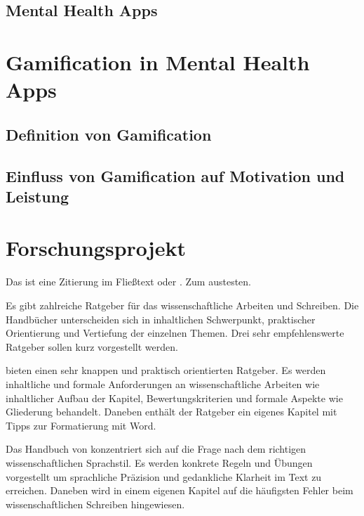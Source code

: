 \subsection{Mental Health Apps}\label{subsubsec:mental_health_apps}



\section{Gamification in Mental Health Apps}\label{subsec:gamification_in_mental_health_apps}


\subsection{Definition von Gamification}\label{subsubsec:definition_gamification}

\subsection{Einfluss von Gamification auf Motivation und Leistung}\label{subsubsec:einfluss_gamification_motivation_leistung}



\section{Forschungsprojekt}\label{subsec:forschungsprojekt}

Das ist eine Zitierung im Fließtext \cite[S. 6]{wagner2021psychische} oder \cite[S. 11]{mustermann2013test}. Zum austesten.


Es gibt zahlreiche Ratgeber für das wissenschaftliche Arbeiten und Schreiben. Die Handbücher unterscheiden sich in inhaltlichen Schwerpunkt, praktischer Orientierung und Vertiefung der einzelnen Themen. Drei sehr empfehlenswerte Ratgeber sollen kurz vorgestellt werden.

\cite{karmasin2012gestaltung} bieten einen sehr knappen und praktisch orientierten Ratgeber. Es werden inhaltliche und formale Anforderungen an wissenschaftliche Arbeiten wie inhaltlicher Aufbau der Kapitel, Bewertungskriterien und formale Aspekte wie Gliederung behandelt. Daneben enthält der Ratgeber ein eigenes Kapitel mit Tipps zur Formatierung mit Word.

Das Handbuch von \cite{esselborn2012richtig} konzentriert sich auf die Frage nach dem richtigen wissenschaftlichen Sprachstil. Es werden konkrete Regeln und Übungen vorgestellt um sprachliche Präzision und gedankliche Klarheit im Text zu erreichen. Daneben wird in einem eigenen Kapitel auf die häufigsten Fehler beim wissenschaftlichen Schreiben hingewiesen.

